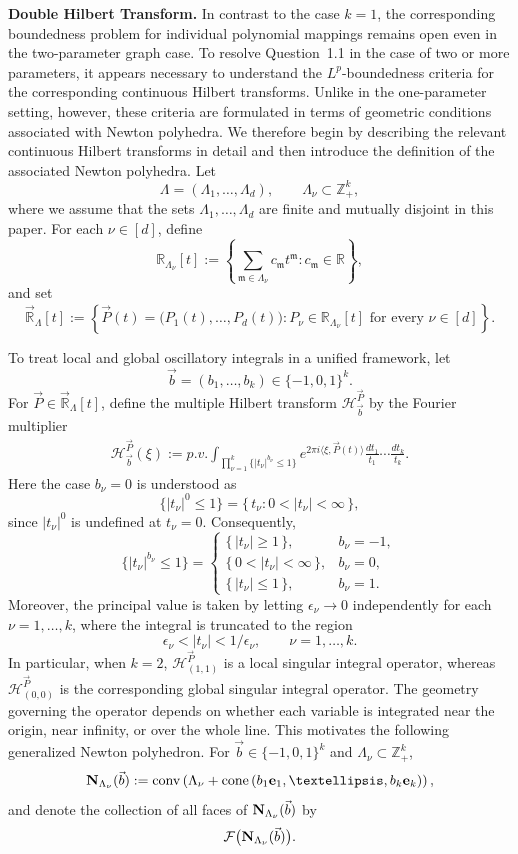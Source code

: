 \documentclass[10pt,a4paper]{amsart}
\numberwithin{equation}{section}
\begin{document}
\noindent\textbf{Double Hilbert Transform.}
In contrast to the case $k=1$, the corresponding boundedness problem
for individual polynomial mappings remains open even in the
two-parameter graph case.  To resolve Question~1.1 in the case of two or more parameters, it appears necessary to understand the $L^p$-boundedness criteria for the corresponding continuous Hilbert transforms. Unlike in the one-parameter setting, however, these criteria are formulated in terms of geometric conditions associated with Newton polyhedra. We therefore begin by describing the relevant continuous Hilbert transforms in  detail and then introduce the definition of the associated Newton polyhedra.
 Let
\[
\Lambda=(\Lambda_1,\ldots,\Lambda_d),
\qquad
\Lambda_\nu\subset\mathbb Z_+^k,
\]  
where we assume that the sets $\Lambda_1,\ldots,\Lambda_d$ are finite and mutually disjoint in this paper. For
each $\nu\in[d]$, define
\[
\mathbb R_{\Lambda_\nu}[t]
:=
\left\{
\sum_{\mathfrak m\in\Lambda_\nu}
c_{\mathfrak m}t^{\mathfrak m}
:
c_{\mathfrak m}\in\mathbb R
\right\},
\]
and set
\[
\vec{\mathbb R}_{\Lambda}[t]
:=
\left\{
\vec P(t)=\bigl(P_1(t),\ldots,P_d(t)\bigr)
:
P_\nu\in\mathbb R_{\Lambda_\nu}[t]
\text{ for every }\nu\in[d]
\right\}.
\]

To treat local and global oscillatory integrals in a unified framework,
let
\[
\vec b=(b_1,\ldots,b_k)\in \{-1,0,1\}^k.
\]
For $\vec P\in\vec{\mathbb R}_{\Lambda}[t]$, define the multiple Hilbert
transform $ \bm{\mathcal{H}}^{\vec P}_{\vec b}$ by the Fourier multiplier
\begin{align}\label{os11}
	\mathcal H^{\vec P}_{\vec b}(\xi)
	:=p.v.
	\int_{\prod_{\nu=1}^k
		\{ |t_\nu|^{b_\nu}\le 1\}}
	e^{2\pi i\langle\xi,\vec P(t)\rangle}
	\frac{dt_1}{t_1}\cdots\frac{dt_k}{t_k}.
\end{align}
Here the case $b_\nu=0$ is understood as
\[
\{|t_\nu|^0\le1\}
=
\{\,t_\nu:0<|t_\nu|<\infty\,\},
\]
since $|t_\nu|^0$ is undefined at $t_\nu=0$.
Consequently,
\[
\{|t_\nu|^{b_\nu}\le1\}
=
\begin{cases}
	\{\,|t_\nu|\ge1\,\}, & b_\nu=-1,\\
	\{\,0<|t_\nu|<\infty\,\}, & b_\nu=0,\\
	\{\,|t_\nu|\le1\,\}, & b_\nu=1.
\end{cases}
\]
Moreover, the principal value is taken by letting
$\epsilon_\nu\rightarrow0$ independently for each
$\nu=1,\ldots,k$, where the integral is truncated to the region
\[
\epsilon_\nu<|t_\nu|<1/\epsilon_\nu,
\qquad
\nu=1,\ldots,k.
\]
In particular, when $k=2$,
$\bm{\mathcal{H}}^{\vec P}_{(1,1)}$
is a local singular integral operator, whereas
$\bm{\mathcal{H}}^{\vec P}_{(0,0)}$
is the corresponding global singular integral operator.
The geometry governing the operator depends on whether each variable is
integrated near the origin, near infinity, or over the whole line.
This motivates the following generalized Newton polyhedron.
For $\vec b\in\{-1,0,1\}^k$ and $\Lambda_{\nu}\subset \mathbb{Z}_+^k$, 
\[
{\bf N}_{\Lambda_\nu}(\vec b)
:=
\operatorname{conv}
\left(
\Lambda_\nu+
\operatorname{cone}
\left( b_1{\bf e}_1,
\ldots,
b_k{\bf e}_k 
\right)
\right),
\]
and  denote the collection of all faces of
${\bf N}_{\Lambda_\nu}(\vec b)$ by
\[
\mathcal F\bigl({\bf N}_{\Lambda_\nu}(\vec b)\bigr).
\]
\end{document}
